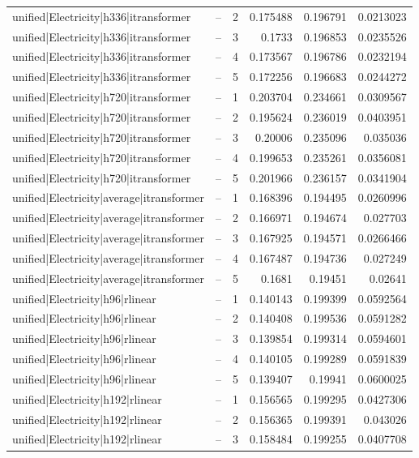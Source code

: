 \begin{longtable}{llrrrr}
unified|Electricity|h336|itransformer & -- & 2 & 0.175488 & 0.196791 & 0.0213023 \\
unified|Electricity|h336|itransformer & -- & 3 & 0.1733 & 0.196853 & 0.0235526 \\
unified|Electricity|h336|itransformer & -- & 4 & 0.173567 & 0.196786 & 0.0232194 \\
unified|Electricity|h336|itransformer & -- & 5 & 0.172256 & 0.196683 & 0.0244272 \\
unified|Electricity|h720|itransformer & -- & 1 & 0.203704 & 0.234661 & 0.0309567 \\
unified|Electricity|h720|itransformer & -- & 2 & 0.195624 & 0.236019 & 0.0403951 \\
unified|Electricity|h720|itransformer & -- & 3 & 0.20006 & 0.235096 & 0.035036 \\
unified|Electricity|h720|itransformer & -- & 4 & 0.199653 & 0.235261 & 0.0356081 \\
unified|Electricity|h720|itransformer & -- & 5 & 0.201966 & 0.236157 & 0.0341904 \\
unified|Electricity|average|itransformer & -- & 1 & 0.168396 & 0.194495 & 0.0260996 \\
unified|Electricity|average|itransformer & -- & 2 & 0.166971 & 0.194674 & 0.027703 \\
unified|Electricity|average|itransformer & -- & 3 & 0.167925 & 0.194571 & 0.0266466 \\
unified|Electricity|average|itransformer & -- & 4 & 0.167487 & 0.194736 & 0.027249 \\
unified|Electricity|average|itransformer & -- & 5 & 0.1681 & 0.19451 & 0.02641 \\
unified|Electricity|h96|rlinear & -- & 1 & 0.140143 & 0.199399 & 0.0592564 \\
unified|Electricity|h96|rlinear & -- & 2 & 0.140408 & 0.199536 & 0.0591282 \\
unified|Electricity|h96|rlinear & -- & 3 & 0.139854 & 0.199314 & 0.0594601 \\
unified|Electricity|h96|rlinear & -- & 4 & 0.140105 & 0.199289 & 0.0591839 \\
unified|Electricity|h96|rlinear & -- & 5 & 0.139407 & 0.19941 & 0.0600025 \\
unified|Electricity|h192|rlinear & -- & 1 & 0.156565 & 0.199295 & 0.0427306 \\
unified|Electricity|h192|rlinear & -- & 2 & 0.156365 & 0.199391 & 0.043026 \\
unified|Electricity|h192|rlinear & -- & 3 & 0.158484 & 0.199255 & 0.0407708 \\

\end{longtable}
